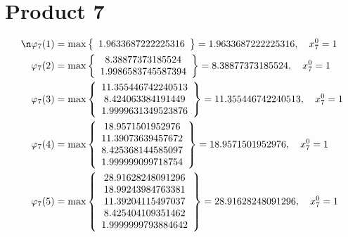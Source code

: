 \documentclass{article}
\begin{document}
\section{Product 7}
\begin{align*}
\n  
  
\varphi_{7}(1) &= \max \left\{ \begin{array}{c}
1.9633687222225316
\end{array} \right\} = 1.9633687222225316, \quad x_{7}^0 = 1\\
  
  
  
  
\varphi_{7}(2) &= \max \left\{ \begin{array}{c}
8.38877373185524 \\
 1.9986583745587394
\end{array} \right\} = 8.38877373185524, \quad x_{7}^0 = 1\\
  
  
  
  
\varphi_{7}(3) &= \max \left\{ \begin{array}{c}
11.355446742240513 \\
 8.424063384191449 \\
 1.9999631349523876
\end{array} \right\} = 11.355446742240513, \quad x_{7}^0 = 1\\
  
  
  
  
\varphi_{7}(4) &= \max \left\{ \begin{array}{c}
18.9571501952976 \\
 11.39073639457672 \\
 8.425368144585097 \\
 1.999999099718754
\end{array} \right\} = 18.9571501952976, \quad x_{7}^0 = 1\\
  
  
  
  
\varphi_{7}(5) &= \max \left\{ \begin{array}{c}
28.91628248091296 \\
 18.99243984763381 \\
 11.39204115497037 \\
 8.425404109351462 \\
 1.9999999793884642
\end{array} \right\} = 28.91628248091296, \quad x_{7}^0 = 1\\
  
  
  

\end{align*}
\end{document}
